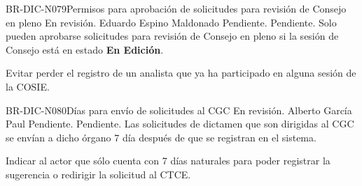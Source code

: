 \begin{BusinessRule}{BR-DIC-N079}{Permisos para aprobación de solicitudes para revisión de Consejo en pleno}
	{\bcCondition} %
	{\btEnabler}     %
	{\blControlling}     %
	\BRItem[Estado] En revisión.
	 Eduardo Espino Maldonado
	 Pendiente.
	 Pendiente.
	\BRItem[Descripción] Solo pueden aprobarse solicitudes para revisión de Consejo en pleno si la sesión de Consejo está en estado \textbf{En Edición}.
	\BRItem[Sentencia] \cdtEmpty
	
	\BRItem[Motivación] Evitar perder el registro de un analista que ya ha participado en alguna sesión de la COSIE.
\end{BusinessRule}

\begin{BusinessRule}{BR-DIC-N080}{Días para envío de solicitudes al CGC}
	{\bcCondition} %
	{\btTimer}     %
	{\blControlling}     %
	\BRItem[Estado] En revisión.
	 Alberto García Paul
	 Pendiente.
	 Pendiente.
	\BRItem[Descripción] Las solicitudes de dictamen que son dirigidas al CGC se envían a dicho órgano 7 día después de que se registran en el sistema.
	\BRItem[Sentencia] \cdtEmpty
	
	\BRItem[Motivación] Indicar al actor que sólo cuenta con 7 días naturales para poder registrar la sugerencia o redirigir la solicitud al CTCE.
\end{BusinessRule}

